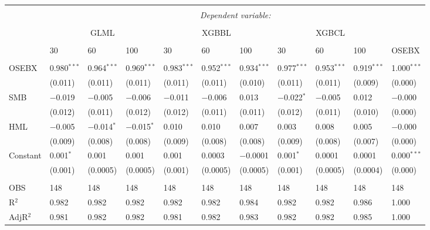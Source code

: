 \begin{appendices}
\begin{table}[H] 
\centering 
\footnotesize
\begin{tabularx}{\textwidth}{XXXXXXXXXXl} 
\\[-2ex]\hline 
\hline \\[-2ex] 
 & \multicolumn{10}{c}{\textit{Dependent variable:}} \\ 
\cline{2-11} 
\\[-2ex] 
 & \multicolumn{3}{c}{GLML} & \multicolumn{3}{c}{XGBBL} & \multicolumn{3}{c}{XGBCL} & \\
 \cline{2-10}
 \\[-2ex] 
 & 30 & 60 & 100 & 30 & 60 & 100 & 30 & 60 & 100 & OSEBX \\ 
 \cline{2-10} \\
 OSEBX & 0.980$^{***}$ & 0.964$^{***}$ & 0.969$^{***}$ & 0.983$^{***}$ & 0.952$^{***}$ & 0.934$^{***}$ & 0.977$^{***}$ & 0.953$^{***}$ & 0.919$^{***}$ & 1.000$^{***}$ \\ 
  & (0.011) & (0.011) & (0.011) & (0.011) & (0.011) & (0.010) & (0.011) & (0.011) & (0.009) & (0.000) \\ 
 SMB & $-$0.019 & $-$0.005 & $-$0.006 & $-$0.011 & $-$0.006 & 0.013 & $-$0.022$^{*}$ & $-$0.005 & 0.012 & $-$0.000 \\ 
  & (0.012) & (0.011) & (0.012) & (0.012) & (0.011) & (0.011) & (0.012) & (0.011) & (0.010) & (0.000) \\ 
 HML & $-$0.005 & $-$0.014$^{*}$ & $-$0.015$^{*}$ & 0.010 & 0.010 & 0.007 & 0.003 & 0.008 & 0.005 & $-$0.000 \\ 
  & (0.009) & (0.008) & (0.008) & (0.009) & (0.008) & (0.008) & (0.009) & (0.008) & (0.007) & (0.000) \\ 
 Constant & 0.001$^{*}$ & 0.001 & 0.001 & 0.001 & 0.0003 & $-$0.0001 & 0.001$^{*}$ & 0.0001 & 0.0001 & 0.000$^{***}$ \\ 
  & (0.001) & (0.0005) & (0.0005) & (0.001) & (0.0005) & (0.0005) & (0.001) & (0.0005) & (0.0004) & (0.000) \\ 
\hline \\[-1.8ex] 
OBS & 148 & 148 & 148 & 148 & 148 & 148 & 148 & 148 & 148 & 148 \\ 
R$^{2}$ & 0.982 & 0.982 & 0.982 & 0.982 & 0.982 & 0.984 & 0.982 & 0.982 & 0.986 & 1.000 \\ 
AdjR$^{2}$ & 0.981 & 0.982 & 0.982 & 0.981 & 0.982 & 0.983 & 0.982 & 0.982 & 0.985 & 1.000 \\ 


\end{tabularx}
\end{table}
\end{appendices}
